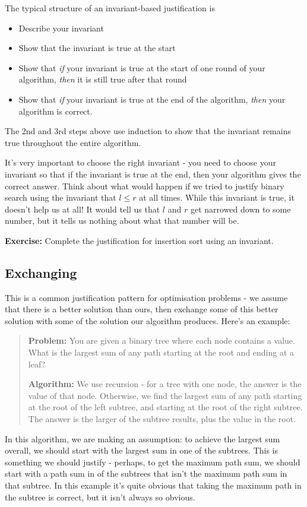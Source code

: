 \documentclass[12pt]{article}
\begin{document}
\begin{question}
The typical structure of an invariant-based justification is
\begin{itemize}
    \item Describe your invariant
    \item Show that the invariant is true at the start
    \item Show that \textit{if} your invariant is true at the start of one round of your algorithm, \textit{then} it is still true after that round
    \item Show that \textit{if} your invariant is true at the end of the algorithm, \textit{then} your algorithm is correct.
\end{itemize}
The 2nd and 3rd steps above use induction to show that the invariant remains true throughout the entire algorithm.

It's very important to choose the right invariant - you need to choose your invariant so that if the invariant is true at the end, then your algorithm gives the correct answer. Think about what would happen if we tried to justify binary search using the invariant that $l \leq r$ at all times. While this invariant is true, it doesn't help us at all! It would tell us that $l$ and $r$ get narrowed down to some number, but it tells us nothing about what that number will be.

\textbf{Exercise:} Complete the justification for insertion sort using an invariant.
\subsection*{Exchanging}

This is a common justification pattern for optimisation problems - we assume that there is a better solution than ours, then exchange some of this better solution with some of the solution our algorithm produces. Here's an example:

\begin{quote}
    \textbf{Problem:} You are given a binary tree where each node contains a value. What is the largest sum of any path starting at the root and ending at a leaf?

    \textbf{Algorithm:} We use recursion - for a tree with one node, the answer is the value of that node. Otherwise, we find the largest sum of any path starting at the root of the left subtree, and starting at the root of the right subtree. The answer is the larger of the subtree results, plus the value in the root.
\end{quote}
In this algorithm, we are making an assumption: to achieve the largest sum overall, we should start with the largest sum in one of the subtrees. This is something we should justify - perhaps, to get the maximum path sum, we should start with a path sum in of the subtrees that isn't the maximum path sum in that subtree. In this example it's quite obvious that taking the maximum path in the subtree is correct, but it isn't always so obvious.


\end{question}
\end{document}
